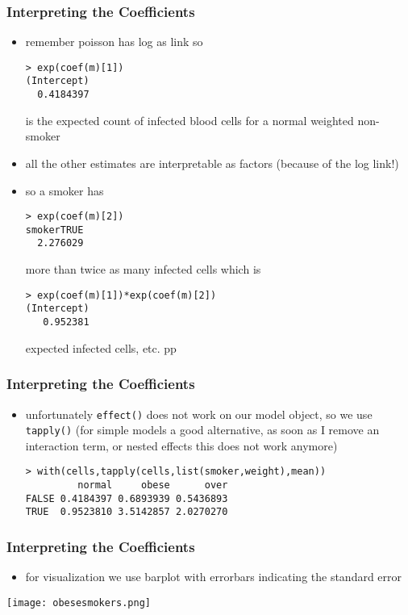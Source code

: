 \begin{frame}[fragile]\frametitle{Interpreting the Coefficients}\footnotesize
  \begin{itemize}
\item remember poisson has log as link so
\begin{verbatim}
> exp(coef(m)[1])
(Intercept) 
  0.4184397 
\end{verbatim}
is the expected count of infected blood cells for a normal weighted non-smoker
\item all the other estimates are interpretable as factors (because of the log link!)
\item so a smoker has 
\begin{verbatim}
> exp(coef(m)[2])
smokerTRUE 
  2.276029 
\end{verbatim}
more than twice as many infected cells which is
\begin{verbatim}
> exp(coef(m)[1])*exp(coef(m)[2])
(Intercept) 
   0.952381 
\end{verbatim}
expected infected cells, etc. pp
  \end{itemize}
\end{frame}

\begin{frame}[fragile]\frametitle{Interpreting the Coefficients}
  \begin{itemize}
  \item unfortunately \texttt{effect()} does not work on our model object, so we use \texttt{tapply()} (for simple models a good alternative, as soon as I remove an interaction term, or nested effects this does not work anymore)\footnotesize
\begin{verbatim}
> with(cells,tapply(cells,list(smoker,weight),mean))
         normal     obese      over
FALSE 0.4184397 0.6893939 0.5436893
TRUE  0.9523810 3.5142857 2.0270270
\end{verbatim}
  \end{itemize}
\end{frame}


\begin{frame}[fragile]\frametitle{Interpreting the Coefficients}
  \begin{itemize}
  \item for visualization we use barplot with errorbars indicating the standard error
  \end{itemize}
\begin{center}
\texttt{[image: obesesmokers.png]}
\end{center}
\end{frame}

